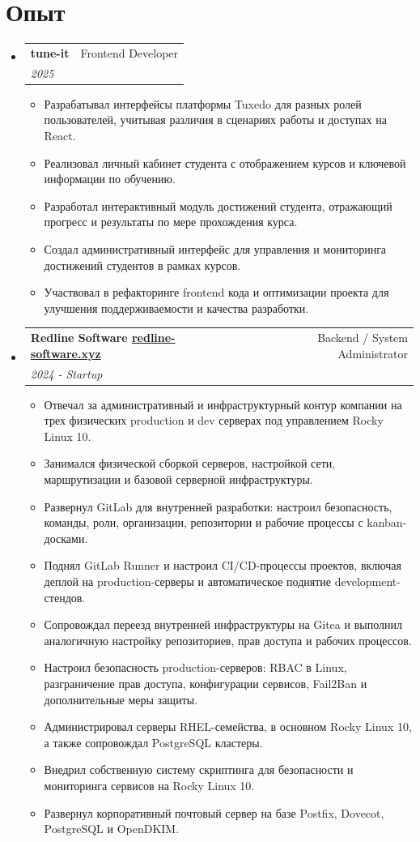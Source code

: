 \documentclass[11pt,a4paper]{article}
\makeatletter
\newcommand{\resumeExpHeading}[4]{
  \item
  \begin{tabular*}{0.985\textwidth}{@{\extracolsep{\fill}} l r}
    \textbf{#1} & #2 \\
    \textit{#3} & \textit{#4} \\
  \end{tabular*}
}
\newcommand{\resumeItem}[1]{
  \item #1
}
\newenvironment{resumeTopList}{
  \begin{itemize}[leftmargin=1.1em,itemsep=0.3em,topsep=0.2em]
}{
  \end{itemize}
}
\newenvironment{resumeSubList}{
  \begin{itemize}[leftmargin=1.55em,itemsep=0.15em,topsep=0.05em,labelsep=0.35em,label=$\circ$]
}{
  \end{itemize}
}
\makeatother
\begin{document}
\section*{Опыт}
\begin{resumeTopList}
  \resumeExpHeading
    {tune-it}
    {Frontend Developer}
    {2025}
    {}
  \begin{resumeSubList}
    \resumeItem{Разрабатывал интерфейсы платформы Tuxedo для разных ролей пользователей, учитывая различия в сценариях работы и доступах на React.}
    \resumeItem{Реализовал личный кабинет студента с отображением курсов и ключевой информации по обучению.}
    \resumeItem{Разработал интерактивный модуль достижений студента, отражающий прогресс и результаты по мере прохождения курса.}
    \resumeItem{Создал административный интерфейс для управления и мониторинга достижений студентов в рамках курсов.}
    \resumeItem{Участвовал в рефакторинге frontend кода и оптимизации проекта для улучшения поддерживаемости и качества разработки.}
  \end{resumeSubList}

  \resumeExpHeading
    {Redline Software \href{https://redline-software.xyz}{redline-software.xyz}}
    {Backend / System Administrator}
    {2024 - Startup}
    {}
  \begin{resumeSubList}
    \resumeItem{Отвечал за административный и инфраструктурный контур компании на трех физических production и dev серверах под управлением Rocky Linux 10.}
    \resumeItem{Занимался физической сборкой серверов, настройкой сети, маршрутизации и базовой серверной инфраструктуры.}
    \resumeItem{Развернул GitLab для внутренней разработки: настроил безопасность, команды, роли, организации, репозитории и рабочие процессы с kanban-досками.}
    \resumeItem{Поднял GitLab Runner и настроил CI/CD-процессы проектов, включая деплой на production-серверы и автоматическое поднятие development-стендов.}
    \resumeItem{Сопровождал переезд внутренней инфраструктуры на Gitea и выполнил аналогичную настройку репозиториев, прав доступа и рабочих процессов.}
    \resumeItem{Настроил безопасность production-серверов: RBAC в Linux, разграничение прав доступа, конфигурации сервисов, Fail2Ban и дополнительные меры защиты.}
    \resumeItem{Администрировал серверы RHEL-семейства, в основном Rocky Linux 10, а также сопровождал PostgreSQL кластеры.}
    \resumeItem{Внедрил собственную систему скриптинга для безопасности и мониторинга сервисов на Rocky Linux 10.}
    \resumeItem{Развернул корпоративный почтовый сервер на базе Postfix, Dovecot, PostgreSQL и OpenDKIM.}
  \end{resumeSubList}


\end{resumeTopList}
\end{document}
